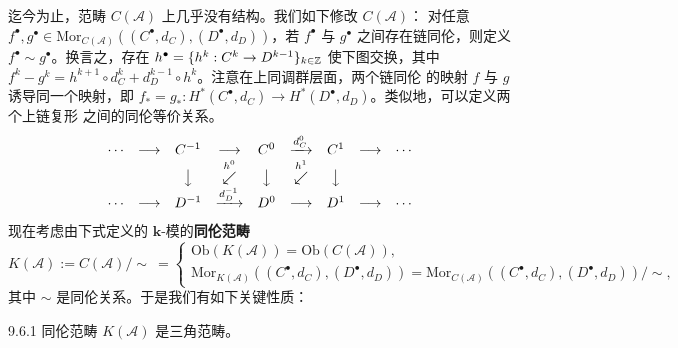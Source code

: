 迄今为止，范畴 $C(\mathcal A)$ 上几乎没有结构。我们如下修改 $C(\mathcal A)$：
对任意 $f^\bullet,g^\bullet\in
\mathrm{Mor}_{C(\mathcal A)}((C^\bullet,d_C),(D^\bullet,d_D))$，若 $f^\bullet$ 与
$g^\bullet$ 之间存在链同伦，则定义 $f^\bullet\sim g^\bullet$。换言之，存在
$h^\bullet=\{h^k:C^k\to D^{k-1}\}_{k\in\mathbb{Z}}$ 使下图交换，其中
$f^k-g^k=h^{k+1}\circ d_C^k+d_D^{k-1}\circ h^k$。注意在上同调群层面，两个链同伦
的映射 $f$ 与 $g$ 诱导同一个映射，即
$f_*=g_*:H^*(C^\bullet,d_C)\to H^*(D^\bullet,d_D)$。类似地，可以定义两个上链复形
之间的同伦等价关系。
\[
\begin{array}{ccccccccc}
\cdots & \longrightarrow & C^{-1} & \longrightarrow & C^0 & \xrightarrow{d_C^0} & C^1
& \longrightarrow & \cdots\\
& & \big\downarrow & \overset{\scriptstyle h^0}{\swarrow} & \big\downarrow
& \overset{\scriptstyle h^1}{\swarrow} & \big\downarrow & & \\
\cdots & \longrightarrow & D^{-1} & \xrightarrow{d_D^{-1}} & D^0 & \longrightarrow & D^1
& \longrightarrow & \cdots
\end{array}
\]
现在考虑由下式定义的 $\mathbf k$-模的\textbf{同伦范畴}
\[
K(\mathcal A):=C(\mathcal A)\big/\sim\ =
\begin{cases}
\mathrm{Ob}(K(\mathcal A))=\mathrm{Ob}(C(\mathcal A)),\\[2pt]
\mathrm{Mor}_{K(\mathcal A)}((C^\bullet,d_C),(D^\bullet,d_D))
=\mathrm{Mor}_{C(\mathcal A)}((C^\bullet,d_C),(D^\bullet,d_D))\big/\sim,
\end{cases}
\]
其中 $\sim$ 是同伦关系。于是我们有如下关键性质：

\begin{wthm}{9.6.1}
同伦范畴 $K(\mathcal A)$ 是三角范畴。
\end{wthm}

